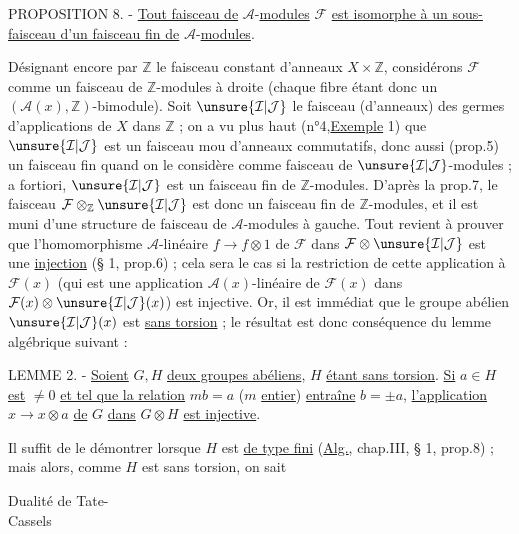PROPOSITION 8. - \uline{Tout faisceau de} $\mathcal A$-\uline{modules} $\mathcal F$ \uline{est isomorphe à un sous-faisceau d'un faisceau fin de} $\mathcal A$-\uline{modules}.

Désignant encore par $\mathbb Z$ le faisceau constant d'anneaux $X\times\mathbb Z$, considérons $\mathcal F$ comme un faisceau de $\mathbb Z$-modules à droite (chaque fibre étant donc un $(\mathcal A(x),\mathbb Z)$-bimodule). Soit $\unsure{\mathcal I|\mathcal J}$ le faisceau (d'anneaux) des germes d'applications de $X$ dans $\mathbb Z$ ; on a vu plus haut (n°4,\uline{Exemple} 1) que $\unsure{\mathcal I|\mathcal J}$ est un faisceau mou d'anneaux commutatifs, donc aussi (prop.5) un faisceau fin quand on le considère comme faisceau de $\unsure{\mathcal I|\mathcal J}$-modules ; a fortiori, $\unsure{\mathcal I|\mathcal J}$ est un faisceau fin de $\mathbb Z$-modules. D'après la prop.7, le faisceau $\mathcal F\otimes_{\mathbb Z}\unsure{\mathcal I|\mathcal J}$ est donc un faisceau fin de $\mathbb Z$-modules, et il est muni d'une structure de faisceau de $\mathcal A$-modules à gauche. Tout revient à prouver que l'homomorphisme $\mathcal A$-linéaire $f\longrightarrow f\otimes1$ de $\mathcal F$ dans $\mathcal F\otimes\unsure{\mathcal I|\mathcal J}$ est une \uline{injection} (§ 1, prop.6) ; cela sera le cas si la restriction de cette application à $\mathcal F(x)$ (qui est une application $\mathcal A(x)$-linéaire de $\mathcal F(x)$ dans $\mathcal F(x)\otimes\unsure{\mathcal I|\mathcal J}(x)$) est injective. Or, il est immédiat que le groupe abélien $\unsure{\mathcal I|\mathcal J}(x)$ est \uline{sans torsion} ; le résultat est donc conséquence du lemme algébrique suivant :

LEMME 2. - \uline{Soient} $G,H$ \uline{deux groupes abéliens}, $H$ \uline{étant sans torsion}. \uline{Si} $a\in H$ \uline{est} $\ne0$ \uline{et tel que la relation} $mb=a$ ($m$ \uline{entier}) \uline{entraîne} $b=\pm a$, \uline{l'application} $x\longrightarrow x\otimes a$ \uline{de} $G$ \uline{dans} $G\otimes H$ \uline{est injective}.

Il suffit de le démontrer lorsque $H$ est \uline{de type fini} (\uline{Alg.}, chap.III, § 1, prop.8) ; mais alors, comme $H$ est sans torsion, on sait

\begin{flushright}
Dualité de Tate-\\
Cassels
\end{flushright}

